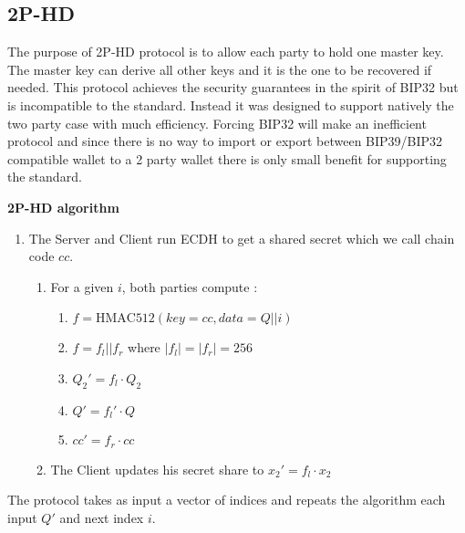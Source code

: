 \documentclass[runningheads]{llncs}
\begin{document}
\subsection{2P-HD} 
The purpose of 2P-HD protocol is to allow each party to hold one master key. The master key can derive all other keys and it is the one to be recovered if needed. This protocol achieves the security guarantees in the spirit of BIP32 but is incompatible to the standard. Instead it was designed to support natively the two party case with much efficiency. Forcing BIP32 will make an inefficient protocol and since there is no way to import or export between BIP39/BIP32 compatible wallet to a 2 party wallet there is only small benefit for supporting the standard.    
\begin{mdframed}[userdefinedwidth = 12.3cm]
\textbf{2P-HD algorithm}
\begin{enumerate}
\item The Server and Client run ECDH to get a shared secret which we call chain code $cc$.
\begin{enumerate}
\item For a given $i$, both parties compute :
\begin{enumerate}
\item ${f = \mathrm{HMAC512}(key=cc, data = Q || i )}$
\item ${f=f_l||f_r}$ where ${|f_l|=|f_r|=256}$
\item ${Q_2' = f_l\cdot Q_2}$  
\item $Q' = f_l' \cdot Q$
\item ${cc' = f_r \cdot cc}$
\end{enumerate}
\item The Client updates his secret share to $x_2' = f_l \cdot x_2$
\end{enumerate}
\end{enumerate}
\end{mdframed}
The protocol takes as input a vector of indices and repeats the algorithm each input $Q'$ and next index $i$.
\end{document}
